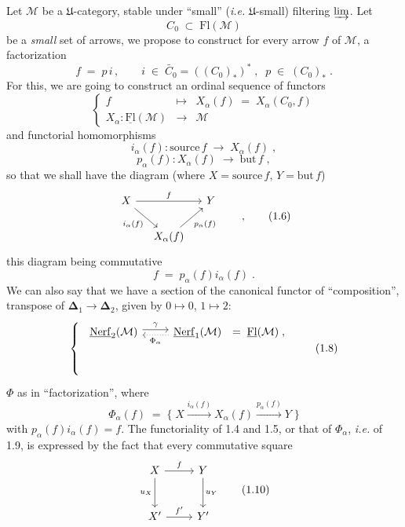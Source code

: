 \documentclass[11pt]{article}
\newcommand{\printedpage}[1]{\marginpar{\footnotesize p.~#1}}
\newcommand{\msp}[1]{\marginpar{\footnotesize [#1]}}
\newcommand{\M}{\mathcal{M}}
\newcommand{\Fl}{\mathrm{Fl}}
\newcommand{\uFl}{\underline{\mathrm{Fl}}}
\newcommand{\uNerf}{\underline{\mathrm{Nerf}}}
\begin{document}
Let $\M$ be a $\mathfrak{U}$-category, stable under ``small'' (\textit{i.e.} $\mathfrak{U}$-small) filtering $\varinjlim$. Let
\[
C_0 \;\subset\; \Fl(\M)
\tag*{(1.1)}
\]
be a \textit{small} set of arrows, we propose to construct for every arrow $f$ of $\M$, a factorization
\[
f \;=\; p\,i \,, \qquad i \;\in\; \widetilde{C_0} = ((C_0)_*)^* \;, \;\; p \;\in\; (C_0)_* \;.
\tag*{(1.2)}
\]
For this, we are going to construct an ordinal sequence of functors
\[
\left\{
\begin{array}{rcl}
f & \longmapsto & X_\alpha(f) \;=\; X_\alpha(C_0,f) \\
X_\alpha : \uFl(\M) & \longrightarrow & \M
\end{array}
\right.
\tag*{(1.3)}
\]
and functorial homomorphisms
\[
i_\alpha(f) : \mathrm{source}\, f \;\longrightarrow\; X_\alpha(f) \;,
\tag*{(1.4)}
\]
\[
p_\alpha(f) : X_\alpha(f) \;\longrightarrow\; \mathrm{but}\, f \;,
\tag*{(1.5)}
\]
so that we shall have the diagram (where $X = \mathrm{source}\, f$, $Y = \mathrm{but}\, f$)
\[
\begin{tikzcd}[column sep=small]
X \arrow[rr, "f"] \arrow[dr, "i_\alpha(f)"'] & & Y \\
& X_\alpha(f) \arrow[ur, "p_\alpha(f)"'] &
\end{tikzcd}
\qquad ,
\tag*{(1.6)}
\]
this diagram being commutative
\[
f \;=\; p_\alpha(f) i_\alpha(f) \;.
\tag*{(1.7)}
\]
We can also say that we have a section of the canonical functor of ``composition'', transpose of $\boldsymbol{\Delta}_1 \longrightarrow \boldsymbol{\Delta}_2$, given by $0 \longmapsto 0$, $1 \longmapsto 2$:
\[
\left\{
\begin{array}{l}
\begin{tikzcd}[ampersand replacement=\&]
\uNerf_2(\M) \arrow[r, shift left, "\gamma"] \& \uNerf_1(\M) \arrow[l, dotted, shift left, "\Phi_\alpha"]
\end{tikzcd}
\;=\; \uFl(\M) \;, \\[1ex]
\\[1ex]
\\
\end{array}
\right.
\tag*{(1.8)}
\]
$\Phi$ as in ``factorization'',
\printedpage{2}
\msp{page 2}
where
\[
\Phi_\alpha(f) \;=\; \{\; X \xrightarrow{i_\alpha(f)} X_\alpha(f) \xrightarrow{p_\alpha(f)} Y \;\}
\tag*{(1.9)}
\]
with $p_\alpha(f)i_\alpha(f) = f$. The functoriality of 1.4 and 1.5, or that of $\Phi_\alpha$, \textit{i.e.} of 1.9, is expressed by the fact that every commutative square
\[
\begin{tikzcd}[row sep=large]
X \arrow[r, "f"] \arrow[d, "u_X"'] & Y \arrow[d, "u_Y"] \\
X' \arrow[r, "{f'}"] & Y'
\end{tikzcd}
\tag*{(1.10)}
\]
\end{document}
